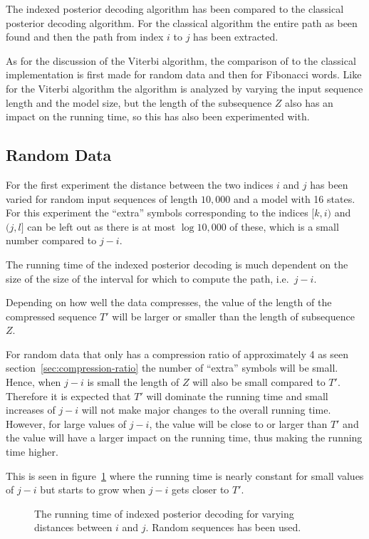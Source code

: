 The indexed posterior decoding algorithm has been compared to the classical
posterior decoding algorithm. For the classical algorithm the entire path as
been found and then the path from index $i$ to $j$ has been extracted.

As for the discussion of the Viterbi algorithm, the comparison of to the
classical implementation is first made for random data and then for Fibonacci
words. Like for the Viterbi algorithm the algorithm is analyzed by varying the
input sequence length and the model size, but the length of the subsequence $Z$
also has an impact on the running time, so this has also been experimented
with.

\subsection{Random Data}

For the first experiment the distance between the two indices $i$ and $j$ has
been varied for random input sequences of length $10,000$ and a model with 16
states. For this experiment the ``extra'' symbols corresponding to the indices
$[k, i)$ and $(j, l]$ can be left out as there is at most $\log 10,000$ of
these, which is a small number compared to $j - i$.

The running time of the indexed posterior decoding is much dependent on the
size of the size of the interval for which to compute the path, i.e.\ $j-i$.

Depending on how well the data compresses, the value of the length of the
compressed sequence $T'$ will be larger or smaller than the length of
subsequence $Z$.

 For random data that only has a compression ratio of
approximately 4 as seen section~\ref{sec:compression-ratio} the number of
``extra'' symbols will be small. Hence, when $j - i$ is small the length of $Z$
will also be small compared to $T'$. Therefore it is expected that $T'$ will
dominate the running time and small increases of $j - i$ will not make major
changes to the overall running time. However, for large values of $j - i$, the
value will be close to or larger than $T'$ and the value will have a larger
impact on the running time, thus making the running time higher.

This is seen in
figure~\ref{fig:assymptotic_indexed_posterior_subseq_length.tex} where the
running time is nearly constant for small values of $j - i$ but starts to grow
when $j - i$ gets closer to $T'$.

\begin{figure}
  \centering
  
  \caption{The running time of indexed posterior decoding for varying distances
    between $i$ and $j$. Random sequences has been used.}
  \label{fig:assymptotic_indexed_posterior_subseq_length.tex}
\end{figure}

